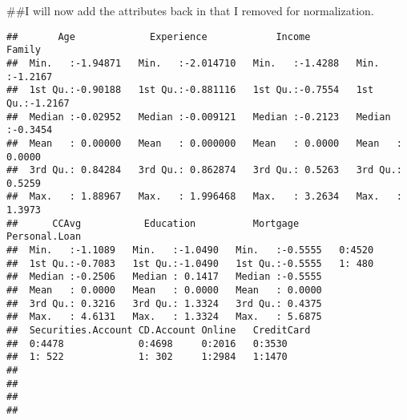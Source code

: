 \documentclass[
]{article}
\newenvironment{Shaded}{\begin{snugshade}}{\end{snugshade}}
\newcommand{\FunctionTok}[1]{\textcolor[rgb]{0.00,0.00,0.00}{#1}}
\newcommand{\NormalTok}[1]{#1}
\newcommand{\OtherTok}[1]{\textcolor[rgb]{0.56,0.35,0.01}{#1}}
\newcommand{\SpecialCharTok}[1]{\textcolor[rgb]{0.00,0.00,0.00}{#1}}
\begin{document}
\#\#I will now add the attributes back in that I removed for
normalization.

\begin{Shaded}
\end{Shaded}

\begin{verbatim}
##       Age             Experience            Income            Family       
##  Min.   :-1.94871   Min.   :-2.014710   Min.   :-1.4288   Min.   :-1.2167  
##  1st Qu.:-0.90188   1st Qu.:-0.881116   1st Qu.:-0.7554   1st Qu.:-1.2167  
##  Median :-0.02952   Median :-0.009121   Median :-0.2123   Median :-0.3454  
##  Mean   : 0.00000   Mean   : 0.000000   Mean   : 0.0000   Mean   : 0.0000  
##  3rd Qu.: 0.84284   3rd Qu.: 0.862874   3rd Qu.: 0.5263   3rd Qu.: 0.5259  
##  Max.   : 1.88967   Max.   : 1.996468   Max.   : 3.2634   Max.   : 1.3973  
##      CCAvg           Education          Mortgage       Personal.Loan
##  Min.   :-1.1089   Min.   :-1.0490   Min.   :-0.5555   0:4520       
##  1st Qu.:-0.7083   1st Qu.:-1.0490   1st Qu.:-0.5555   1: 480       
##  Median :-0.2506   Median : 0.1417   Median :-0.5555                
##  Mean   : 0.0000   Mean   : 0.0000   Mean   : 0.0000                
##  3rd Qu.: 0.3216   3rd Qu.: 1.3324   3rd Qu.: 0.4375                
##  Max.   : 4.6131   Max.   : 1.3324   Max.   : 5.6875                
##  Securities.Account CD.Account Online   CreditCard
##  0:4478             0:4698     0:2016   0:3530    
##  1: 522             1: 302     1:2984   1:1470    
##                                                   
##                                                   
##                                                   
## 
\end{verbatim}
\end{document}
